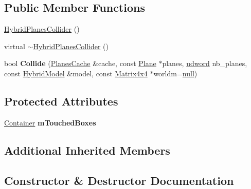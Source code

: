 \subsection*{Public Member Functions}
\begin{DoxyCompactItemize}
\item 
\hyperlink{classOpcode_1_1HybridPlanesCollider_a8b2d131bec9a5f4a7b6e0df2d40cdbed}{Hybrid\+Planes\+Collider} ()
\item 
virtual \hyperlink{classOpcode_1_1HybridPlanesCollider_afb95e4c5d32a2c6f2e8a862a26d27fe1}{$\sim$\+Hybrid\+Planes\+Collider} ()
\item 
bool {\bfseries Collide} (\hyperlink{structOpcode_1_1PlanesCache}{Planes\+Cache} \&cache, const \hyperlink{classOpcode_1_1Plane}{Plane} $\ast$planes, \hyperlink{IceTypes_8h_a44c6f1920ba5551225fb534f9d1a1733}{udword} nb\+\_\+planes, const \hyperlink{classOpcode_1_1HybridModel}{Hybrid\+Model} \&model, const \hyperlink{classOpcode_1_1Matrix4x4}{Matrix4x4} $\ast$worldm=\hyperlink{IceTypes_8h_ac97b8ee753e4405397a42ad5799b0f9e}{null})\hypertarget{classOpcode_1_1HybridPlanesCollider_aeb4673000a3059f452ee8b48d81f5328}{}\label{classOpcode_1_1HybridPlanesCollider_aeb4673000a3059f452ee8b48d81f5328}

\end{DoxyCompactItemize}
\subsection*{Protected Attributes}
\begin{DoxyCompactItemize}
\item 
\hyperlink{classContainer}{Container} {\bfseries m\+Touched\+Boxes}\hypertarget{classOpcode_1_1HybridPlanesCollider_a0ed4d0dbd6579de979b6a1802cd807e2}{}\label{classOpcode_1_1HybridPlanesCollider_a0ed4d0dbd6579de979b6a1802cd807e2}

\end{DoxyCompactItemize}
\subsection*{Additional Inherited Members}


\subsection{Constructor \& Destructor Documentation}
